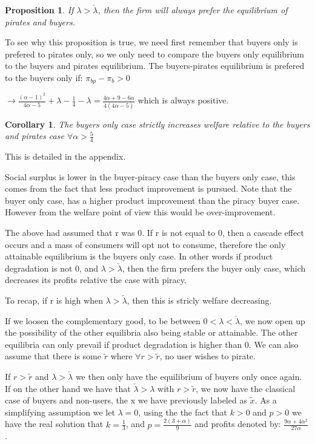 \documentclass{article}
\newtheorem{corollary}{Corollary}
\newtheorem{proposition}{Proposition}
\begin{document}
\begin{proposition}
If $\lambda>\check{\lambda}$, then the firm will always prefer the equilibrium of pirates and buyers. 
\end{proposition}

To see why this proposition is true, we need first remember that buyers only is prefered to pirates only, so we only need to compare the buyers only equilibrium to the buyers and pirates equilibrium. The buyers-pirates equilibrium is prefered to the buyers only if: $\pi_{bp}-\pi_{b} >0$

$\rightarrow \frac{(\alpha-1)^2}{4\alpha-5}+\lambda-\frac{1}{4}-\lambda=\frac{4\alpha +9-6\alpha}{4(4\alpha-5)}$ which is always positive. 

\begin{corollary}
The buyers only case strictly increases welfare relative to the buyers and pirates case $\forall \alpha> \frac{5}{4}$
\end{corollary}

This is detailed in the appendix. 

Social surplus is lower in the buyer-piracy case than the buyers only case, this comes from the fact that less product improvement is pursued. Note that the buyer only case, has a higher product improvement than the piracy buyer case.  However from the welfare point of view this would be over-improvement. 

The above had assumed that r was 0. If r is not equal to 0, then a cascade effect occurs and a mass of consumers will opt not to consume, therefore the only attainable equilibrium is the buyers only case. In other words if product degradation is not 0, and $\lambda>\check{\lambda}$, then the firm prefers the buyer only case, which decreases its profits relative the case with piracy. 

To recap, if r is high when $\lambda>\check{\lambda}$, then this is stricly welfare decreasing. 

If we loosen the complementary good, to be between $0<\lambda<\check{\lambda}$, we now open up the possibility of the other equilibria also being stable or attainable. The other equilibria can only prevail if product degradation is higher than 0. We can also assume that there is some $\tilde{r}$ where $\forall r>\tilde{r} $, no user wishes to pirate. 

If $r>\tilde{r} $ and $\lambda>\check{\lambda}$ we then only have the equilibrium of buyers only once again. If on the other hand we have that $\check{\lambda}>\lambda$ with $r>\tilde{r} $, we now have the classical case of buyers and non-users, the x we have previously labeled as $\tilde{x}$. As a simplifying assumption we let $\lambda=0$, using the the fact that $k>0$ and $p>0$ we have the real solution that $k=\frac{1}{3}$, and $p=\frac{2(3+\alpha)}{9}$ and profits denoted by: $\frac{9\alpha +4\alpha^2}{27 \alpha}$. 
\end{document}
